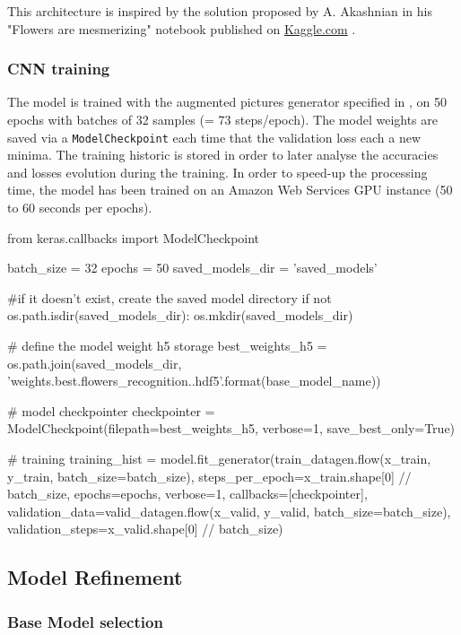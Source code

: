 This architecture is inspired by the solution proposed by A. Akashnian in his "Flowers are mesmerizing" notebook published on \href{https://www.kaggle.com/aakashnain/flowers-are-mesmerizing}{Kaggle.com}  \cite{NAIN_notebook}.

\subsubsection{CNN training}

The model is trained with the augmented pictures generator specified in ,  on 50 epochs with batches of 32 samples (= 73 steps/epoch). The model weights are saved via a \texttt{ModelCheckpoint} each time that the validation loss each a new minima. The training historic is stored in order to later analyse the accuracies and losses evolution during the training. In order to speed-up the processing time, the model has been trained on an Amazon Web Services GPU instance (50 to 60 seconds per epochs).

\begin{python}
from keras.callbacks import ModelCheckpoint 
	
batch_size = 32
epochs = 50
saved_models_dir = 'saved_models'

#if it doesn't exist, create the saved model directory 
if not os.path.isdir(saved_models_dir):
	os.mkdir(saved_models_dir)

# define the model weight h5 storage
best_weights_h5 = os.path.join(saved_models_dir,
	'weights.best.flowers_recognition.{}.hdf5'.format(base_model_name))

# model checkpointer
checkpointer = ModelCheckpoint(filepath=best_weights_h5, 
	verbose=1, save_best_only=True)

# training
training_hist = model.fit_generator(train_datagen.flow(x_train, y_train, batch_size=batch_size),
	steps_per_epoch=x_train.shape[0] // batch_size,
	epochs=epochs, 
	verbose=1, 
	callbacks=[checkpointer],
	validation_data=valid_datagen.flow(x_valid, y_valid, batch_size=batch_size),
	validation_steps=x_valid.shape[0] // batch_size)
	
\end{python}

\subsection{Model Refinement}

\subsubsection{Base Model selection}

